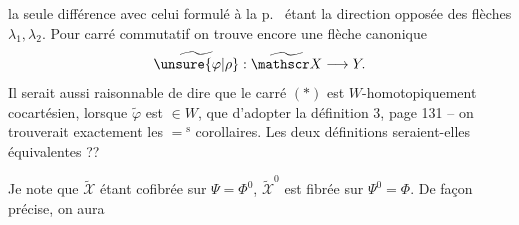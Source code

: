 la seule différence avec celui formulé à la p.~ étant la direction opposée des flèches $\lambda_1,\lambda_2$. Pour  carré commutatif
on trouve encore une flèche canonique
\[
\widetilde{\unsure{\varphi|\rho}}:\widetilde{\mathscr X}\longrightarrow Y .
\]
Il serait  aussi raisonnable de dire que le carré $(\ast)$ est $W$-homotopiquement cocartésien, lorsque $\widetilde\varphi$ est $\in W$, que d'adopter la définition 3, page 131 -- on trouverait exactement les $=\!{}^{\mathrm{s}}$ corollaires. Les deux définitions seraient-elles équivalentes ??

Je note que $\widetilde{\mathscr X}$ étant cofibrée sur $\Psi=\Phi^0$, $\widetilde{\mathscr X}^0$ est fibrée sur $\Psi^0=\Phi$. De façon précise, on aura
